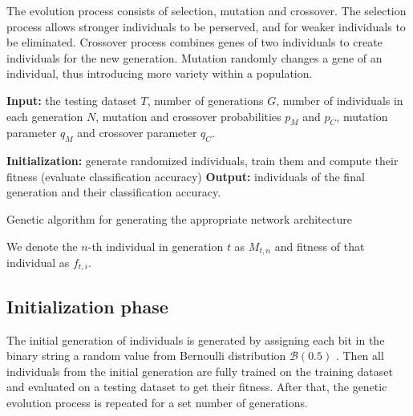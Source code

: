 \documentclass[eng]{simposium}
\begin{document}
The evolution process consists of selection, mutation and crossover. 
The selection process allows stronger individuals to be perserved, and for weaker individuals to be eliminated.
Crossover process combines genes of two individuals to create individuals for the new generation.
Mutation randomly changes a gene of an individual, thus introducing more variety within a population.


\begin{algorithm}[H]
  \SetAlgoLined
  \textbf{Input:} the testing dataset $T$, number of generations $G$, number of individuals in each generation $N$,
  mutation and crossover probabilities $p_M$ and $p_C$, mutation parameter $q_M$ and crossover parameter $q_C$.

  \textbf{Initialization:} generate randomized individuals, train them and compute their fitness (evaluate classification accuracy)\;
   \textbf{Output:} individuals of the final generation and their classification accuracy.
   \caption{Genetic algorithm for generating the appropriate network architecture}
\end{algorithm}


We denote the $n$-th individual in generation $t$ as $M_{t,n}$ and fitness of that individual as $f_{t,i}$.

\subsection{Initialization phase}
The initial generation of individuals is generated by assigning each bit in the binary string a random value from Bernoulli distribution $\mathcal{B}(0.5)$ \cite{4}.
Then all individuals from the initial generation are fully trained on the training dataset and evaluated on a testing dataset to get their fitness.
After that, the genetic evolution process is repeated for a set number of generations.
\end{document}
